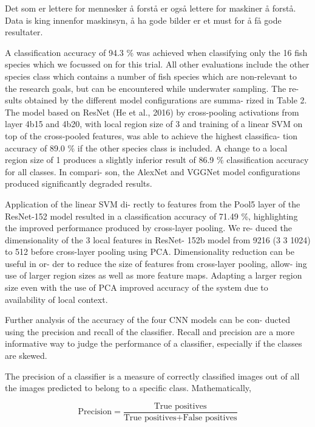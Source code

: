Det som er lettere for mennesker å forstå er også lettere for maskiner å forstå. Data is king innenfor maskinsyn, å ha gode bilder er et must for å få gode resultater. 

A classification accuracy of 94.3 \% was achieved when classifying only the 16 fish species which we focussed on for this trial. All other evaluations include the other species class which contains a number of fish species which are non-relevant to the research goals, but can be encountered while underwater sampling. The re- sults obtained by the different model configurations are summa- rized in Table 2. The model based on ResNet (He et al., 2016) by cross-pooling activations from layer 4b15 and 4b20, with local region size of 3 and training of a linear SVM on top of the cross-pooled features, was able to achieve the highest classifica- tion accuracy of 89.0 \% if the other species class is included. A change to a local region size of 1 produces a slightly inferior result of 86.9 \% classification accuracy for all classes. In compari- son, the AlexNet and VGGNet model configurations produced significantly degraded results.

Application of the linear SVM di- rectly to features from the Pool5 layer of the ResNet-152 model resulted in a classification accuracy of 71.49 \%, highlighting the improved performance produced by cross-layer pooling. We re- duced the dimensionality of the 3 local features in ResNet- 152b model from 9216 (3 3 1024) to 512 before cross-layer pooling using PCA. Dimensionality reduction can be useful in or- der to reduce the size of features from cross-layer pooling, allow- ing use of larger region sizes as well as more feature maps. Adapting a larger region size even with the use of PCA improved accuracy of the system due to availability of local context. 

Further analysis of the accuracy of the four CNN models can be con- ducted using the precision and recall of the classifier. Recall and precision are a more informative way to judge the performance of a classifier, especially if the classes are skewed.

The precision of a classifier is a measure of correctly classified images out of all the images predicted to belong to a specific class. Mathematically,

\begin{equation}
\text{Precision} = \frac{\text{True positives}}{\text{True positives} + \text{False positives}}
\end{equation}

